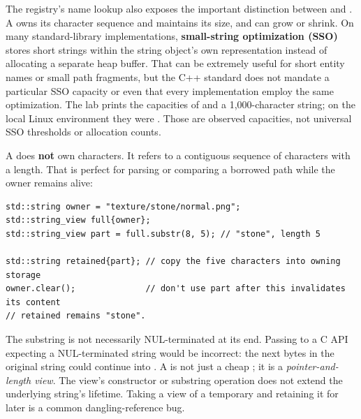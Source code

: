The registry's name lookup also exposes the important distinction between  and . A  owns its character sequence and maintains its size, and can grow or shrink. On many standard-library implementations, \textbf{small-string optimization (SSO)} stores short strings within the string object's own representation instead of allocating a separate heap buffer. That can be extremely useful for short entity names or small path fragments, but the C++ standard does not mandate a particular SSO capacity or even that every implementation employ the same optimization. The lab prints the capacities of  and a 1,000-character string; on the local Linux environment they were . Those are observed capacities, not universal SSO thresholds or allocation counts.

A  does \textbf{not} own characters. It refers to a contiguous sequence of characters with a length. That is perfect for parsing or comparing a borrowed path while the owner remains alive:

\begin{verbatim}
std::string owner = "texture/stone/normal.png";
std::string_view full{owner};
std::string_view part = full.substr(8, 5); // "stone", length 5

std::string retained{part}; // copy the five characters into owning storage
owner.clear();              // don't use part after this invalidates its content
// retained remains "stone".
\end{verbatim}

The substring is not necessarily NUL-terminated at its end. Passing  to a C API expecting a NUL-terminated string would be incorrect: the next bytes in the original string could continue into . A  is not just a cheap ; it is a \emph{pointer-and-length view}. The view's constructor or substring operation does not extend the underlying string's lifetime. Taking a view of a temporary  and retaining it for later is a common dangling-reference bug.

